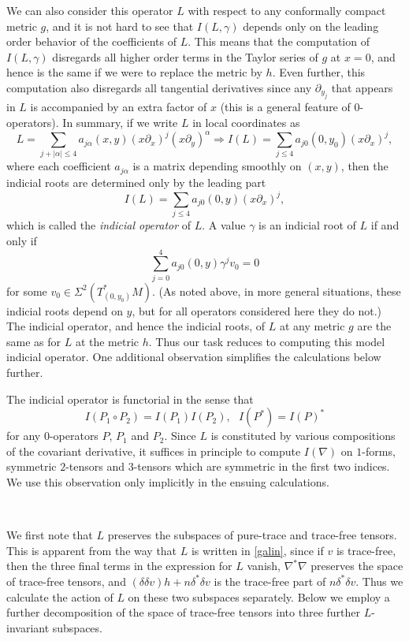 \documentclass[10pt,reqno]{amsart}
\newcommand{\del}{\partial}
\begin{document}
We can also consider this operator $L$ with respect to any conformally compact metric $g$, and it is not hard to see that $I(L,\gamma)$ depends only
on the leading order behavior of the coefficients of $L$. This means that the computation of $I(L,\gamma)$ disregards all higher order terms 
in the Taylor series of $g$ at $x=0$, and hence is the same if we were to replace the metric by $h$.  Even further, this computation also
disregards all tangential derivatives since any $\del_{y_j}$ that appears in $L$ is accompanied by an extra factor of $x$ (this is a general
feature of $0$-operators).  In summary, if we write $L$ in local coordinates as 
\[
L = \sum_{j + |\alpha| \leq 4}  a_{j \alpha}(x,y) (x\del_x)^j (x\del_y)^\alpha  \Longrightarrow I(L) = \sum_{j \leq 4} a_{j0}(0,y_0) (x\del_x)^j,
\]
where each coefficient $a_{j\alpha}$ is a matrix depending smoothly on $(x,y)$, then the indicial roots are determined only by the
leading part
\[
I(L) = \sum_{j \leq 4} a_{j 0}(0,y) (x\del_x)^j ,
\]
which is called the {\it indicial operator} of $L$.  A value $\gamma$ is an indicial root of $L$ if and only if 
\[
\sum_{j=0}^4 a_{j0}(0,y) \gamma^j v_0 = 0
\]
for some $v_0 \in \Sigma^2( T^*_{(0,y_0)}M)$.   (As noted above, in more general situations, these indicial roots depend on $y$,
but for all operators considered here they do not.)  The indicial operator, and hence the indicial roots, of $L$ at any metric $g$ are
the same as for $L$ at the metric $h$. Thus our task reduces to computing this model indicial operator. 
One additional observation simplifies the calculations below further.  

The indicial operator is functorial in the sense that
\[
I( P_1 \circ P_2) = I(P_1) I(P_2), \ \ \ I(P^*) = I(P)^*
\]
for any $0$-operators $P$, $P_1$ and $P_2$. Since $L$ is constituted by  various compositions of the covariant derivative,
it suffices in principle to compute $I(\nabla)$ on $1$-forms, symmetric $2$-tensors and $3$-tensors which are symmetric in the first two indices.
We use this observation only implicitly in the ensuing calculations.

\ 

We first note that $L$ preserves the subspaces of pure-trace and trace-free tensors.  This is apparent from the way that $L$ is written in \eqref{galin},
since if $v$ is trace-free, then the three final terms in the expression for $L$ vanish, $\nabla^* \nabla$ preserves the space of trace-free tensors,
and $(\delta \delta v) h + n\delta^* \delta v$ is the trace-free part of $n \delta^* \delta v$.  Thus we calculate the action of $L$ on these two 
subspaces separately. Below we employ a further decomposition of the space of trace-free tensors into three further $L$-invariant subspaces. 
\end{document}
